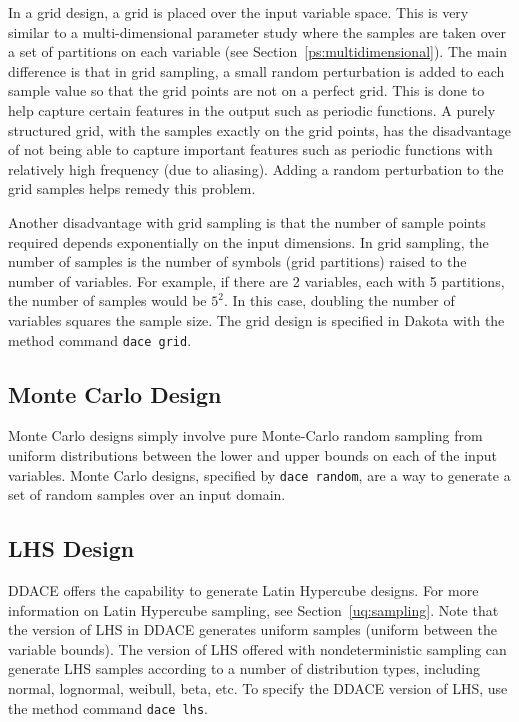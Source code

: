 In a grid design, a grid is placed over the input variable space. 
This is very similar to a multi-dimensional parameter study where 
the samples are taken over a set of partitions on each variable 
(see Section~\ref{ps:multidimensional}).  The main difference is 
that in grid sampling, a small random perturbation is added 
to each sample value so that the grid points are not on a perfect grid. 
This is done to help capture certain features in the output such as periodic
functions. A purely structured grid, with the samples exactly on the grid 
points, has the disadvantage of not being able to capture important features 
such as periodic functions with relatively high frequency (due to aliasing). 
Adding a random perturbation to the grid samples helps remedy this problem.

Another disadvantage with grid sampling is that the number of sample points 
required depends exponentially on the input dimensions.  In grid sampling, 
the number of samples is the number of symbols (grid partitions) raised 
to the number of variables.  For example, if there are 2 variables, each 
with 5 partitions, the number of samples would be $5^2$.  In this 
case, doubling the number of variables squares the sample size. 
The grid design is specified in 
Dakota with the method command \texttt{dace grid}.

\subsection{Monte Carlo Design}\label{dace:mc}

Monte Carlo designs simply involve pure Monte-Carlo random sampling 
from uniform distributions between the lower and upper bounds on each 
of the input variables.  Monte Carlo designs, specified by 
\texttt{dace random}, are a way to generate a set of random samples 
over an input domain.

\subsection{LHS Design}\label{dace:lhs}

DDACE offers the capability to generate Latin Hypercube designs. 
For more information on Latin Hypercube sampling, see 
Section~\ref{uq:sampling}.  Note that the version of LHS in DDACE 
generates uniform samples (uniform between the variable bounds). 
The version of LHS offered with nondeterministic sampling can generate 
LHS samples according to a number of distribution types, including 
normal, lognormal, weibull, beta, etc. To specify the DDACE version 
of LHS, use the method command \texttt{dace lhs}.

